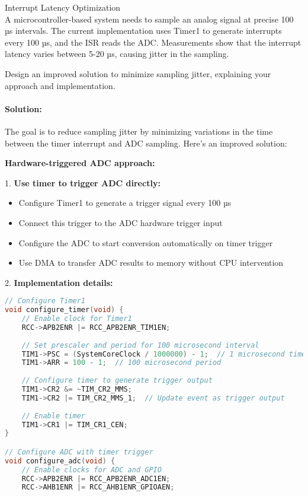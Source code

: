 \begin{example2}{Interrupt Latency Optimization}\\
A microcontroller-based system needs to sample an analog signal at precise 100 µs intervals. The current implementation uses Timer1 to generate interrupts every 100 µs, and the ISR reads the ADC. Measurements show that the interrupt latency varies between 5-20 µs, causing jitter in the sampling.

Design an improved solution to minimize sampling jitter, explaining your approach and implementation.

\tcblower
\paragraph{Solution:}

The goal is to reduce sampling jitter by minimizing variations in the time between the timer interrupt and ADC sampling. Here's an improved solution:

\textbf{Hardware-triggered ADC approach:}

1. \textbf{Use timer to trigger ADC directly:}
   \begin{itemize}
     \item Configure Timer1 to generate a trigger signal every 100 µs
     \item Connect this trigger to the ADC hardware trigger input
     \item Configure the ADC to start conversion automatically on timer trigger
     \item Use DMA to transfer ADC results to memory without CPU intervention
   \end{itemize}

2. \textbf{Implementation details:}
\begin{lstlisting}[language=C, style=basesmol]
// Configure Timer1
void configure_timer(void) {
    // Enable clock for Timer1
    RCC->APB2ENR |= RCC_APB2ENR_TIM1EN;
    
    // Set prescaler and period for 100 microsecond interval
    TIM1->PSC = (SystemCoreClock / 1000000) - 1;  // 1 microsecond timer ticks
    TIM1->ARR = 100 - 1;  // 100 microsecond period
    
    // Configure timer to generate trigger output
    TIM1->CR2 &= ~TIM_CR2_MMS;
    TIM1->CR2 |= TIM_CR2_MMS_1;  // Update event as trigger output
    
    // Enable timer
    TIM1->CR1 |= TIM_CR1_CEN;
}

// Configure ADC with timer trigger
void configure_adc(void) {
    // Enable clocks for ADC and GPIO
    RCC->APB2ENR |= RCC_APB2ENR_ADC1EN;
    RCC->AHB1ENR |= RCC_AHB1ENR_GPIOAEN;
    

\end{lstlisting}
\end{example2}
